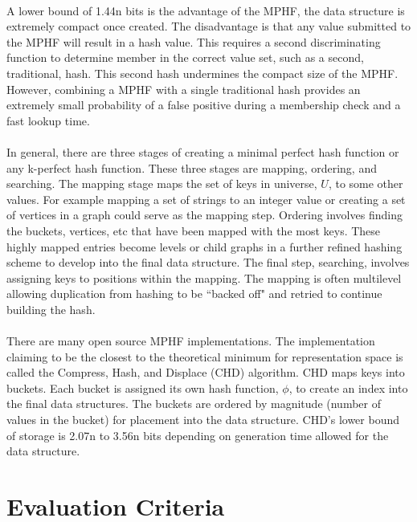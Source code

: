 			\paragraph{}A lower bound of 1.44n bits is the advantage of the MPHF,\cite{belazzougui_hash_2009} the data structure is extremely compact once created.  The disadvantage is that any value submitted to the MPHF will result in a hash value.  This requires a second discriminating function to determine member in the correct value set, such as a second, traditional, hash.  This second hash undermines the compact size of the MPHF.  However, combining a MPHF with a single traditional hash provides an extremely small probability of a false positive during a membership check and a fast lookup time.
			\paragraph{} In general, there are three stages of creating a minimal perfect hash function or any k-perfect hash function.  These three stages are mapping, ordering, and searching.  The mapping stage maps the set of keys in universe, $U$, to some other values.  For example mapping a set of strings to an integer value or creating a set of vertices in a graph could serve as the mapping step.  Ordering involves finding the buckets, vertices, etc that have been mapped with the most keys.  These highly mapped entries become levels or child graphs in a further refined hashing scheme to develop into the final data structure. The final step, searching, involves assigning keys to positions within the mapping.  The mapping is often multilevel allowing duplication from hashing to be ``backed off" and retried to continue building the hash.			
			\paragraph{}There are many open source MPHF implementations.  The implementation claiming to be the closest to the theoretical minimum for representation space is called the Compress, Hash, and Displace (CHD) algorithm\cite{_cmph_????}.  CHD maps keys into buckets.  Each bucket is assigned its own hash function, $\phi$, to create an index into the final data structures.  The buckets are ordered by magnitude (number of values in the bucket) for placement into the data structure.  CHD's lower bound of storage is 2.07n to 3.56n bits depending on generation time allowed for the data structure.

\section {Evaluation Criteria}
